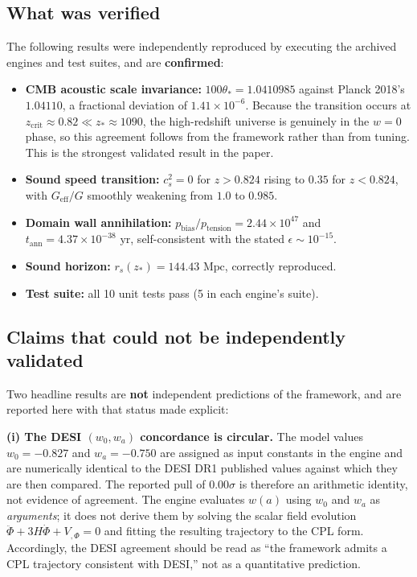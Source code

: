 \documentclass[aps,prd,twocolumn,superscriptaddress,nofootinbib,floatfix,longbibliography]{revtex4-2}
\begin{document}
\subsection{What was verified}
The following results were independently reproduced by executing the archived engines and test suites, and are \textbf{confirmed}:
\begin{itemize}
\item \textbf{CMB acoustic scale invariance:} $100\theta_* = 1.0410985$ against Planck 2018's $1.04110$, a fractional deviation of $1.41 \times 10^{-6}$. Because the transition occurs at $z_{\text{crit}} \approx 0.82 \ll z_* \approx 1090$, the high-redshift universe is genuinely in the $w = 0$ phase, so this agreement follows from the framework rather than from tuning. This is the strongest validated result in the paper.
\item \textbf{Sound speed transition:} $c_s^2 = 0$ for $z > 0.824$ rising to $0.35$ for $z < 0.824$, with $G_{\text{eff}}/G$ smoothly weakening from $1.0$ to $0.985$.
\item \textbf{Domain wall annihilation:} $p_{\text{bias}}/p_{\text{tension}} = 2.44 \times 10^{47}$ and $t_{\text{ann}} = 4.37 \times 10^{-38}\text{ yr}$, self-consistent with the stated $\epsilon \sim 10^{-15}$.
\item \textbf{Sound horizon:} $r_s(z_*) = 144.43\text{ Mpc}$, correctly reproduced.
\item \textbf{Test suite:} all 10 unit tests pass (5 in each engine's suite).
\end{itemize}

\subsection{Claims that could not be independently validated}
Two headline results are \textbf{not} independent predictions of the framework, and are reported here with that status made explicit:

\textbf{(i) The DESI $(w_0, w_a)$ concordance is circular.} The model values $w_0 = -0.827$ and $w_a = -0.750$ are assigned as input constants in the engine and are numerically identical to the DESI DR1 published values against which they are then compared. The reported pull of $0.00\sigma$ is therefore an arithmetic identity, not evidence of agreement. The engine evaluates $w(a)$ using $w_0$ and $w_a$ as \textit{arguments}; it does not derive them by solving the scalar field evolution $\ddot{\Phi} + 3H\dot{\Phi} + V_{,\Phi} = 0$ and fitting the resulting trajectory to the CPL form. Accordingly, the DESI agreement should be read as ``the framework admits a CPL trajectory consistent with DESI,'' not as a quantitative prediction.
\end{document}
